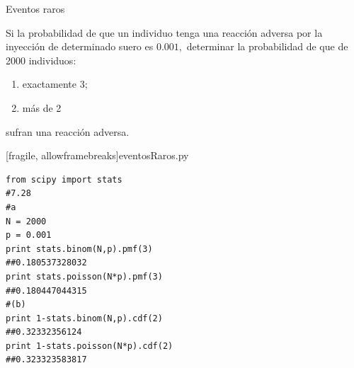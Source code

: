 {Eventos raros}
\begin{ejemplo}
\label{sol:0.7.28}
  Si la probabilidad de que un individuo tenga una reacción adversa por la inyección de determinado suero es $0.001,$ determinar la probabilidad de que de 2000 individuos:
 \begin{enumerate}
  \item exactamente 3;
  \item más de 2
 \end{enumerate}
sufran una reacción adversa.
\end{ejemplo}


[fragile, allowframebreaks]{eventosRaros.py}
 \begin{verbatim}
from scipy import stats
#7.28
#a
N = 2000
p = 0.001
print stats.binom(N,p).pmf(3)
##0.180537328032
print stats.poisson(N*p).pmf(3)
##0.180447044315
#(b)
print 1-stats.binom(N,p).cdf(2)
##0.32332356124
print 1-stats.poisson(N*p).cdf(2)
##0.323323583817
 \end{verbatim}


